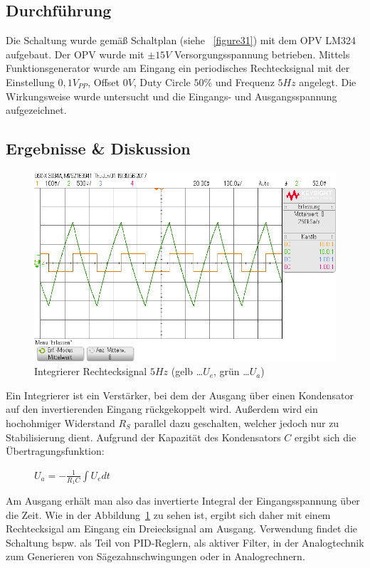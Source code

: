 \documentclass[12pt,a4paper,titlepage]{article}
\begin{document}
\subsection*{Durchf\"uhrung}
Die Schaltung wurde gemäß Schaltplan (siehe ~\ref{figure31}) mit dem OPV LM324 aufgebaut. Der OPV wurde mit $\pm 15V$ Versorgungsspannung betrieben. Mittels Funktionsgenerator wurde am Eingang ein periodisches Rechtecksignal mit der Einstellung $0,1 V_{PP}$, Offset $0V$, Duty Circle $50\%$ und Frequenz $5Hz$ angelegt. Die Wirkungsweise wurde untersucht und die Eingangs- und Ausgangsspannung aufgezeichnet.

\subsection*{Ergebnisse \& Diskussion}
\begin{figure}[H]
  \centering
  \includegraphics[width=150mm]{integrierer_rechtecksignal_eingang_ausgang.png}
  \caption{Integrierer Rechtecksignal $5Hz$ (gelb \dots $U_e$, gr\"un \dots $U_a$)}
  \label{figure32}
\end{figure}
Ein Integrierer ist ein Verst\"arker, bei dem der Ausgang \"uber einen Kondensator auf den invertierenden Eingang r\"uckgekoppelt wird. Au\ss erdem wird ein hochohmiger Widerstand $R_S$ parallel dazu geschalten, welcher jedoch nur zu Stabilisierung dient. Aufgrund der Kapazit\"at des Kondensators $C$ ergibt sich die \"Ubertragungsfunktion:
\begin{figure}[H]
\centering
$U_a = - \frac{1}{R_1C} \int U_e dt$
\end{figure}
\noindent Am Ausgang erh\"alt man also das invertierte Integral der Eingangsspannung \"uber die Zeit. Wie in der Abbildung~\ref{figure32} zu sehen ist, ergibt sich daher mit einem Rechtecksigal am Eingang ein Dreiecksignal am Ausgang. Verwendung findet die Schaltung bspw. als Teil von PID-Reglern, als aktiver Filter, in der Analogtechnik zum Generieren von S\"agezahnschwingungen oder in Analogrechnern.
\end{document}

